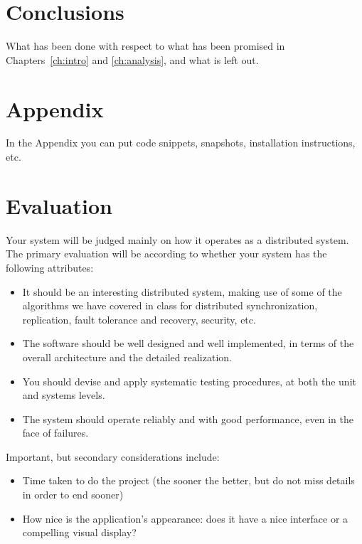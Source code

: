 \documentclass{memoir}
\begin{document}
\chapter{Conclusions}

What has been done with respect to what has been promised in Chapters~\ref{ch:intro} and \ref{ch:analysis}, and what is left out.

\appendix

\chapter{Appendix}

In the Appendix you can put code snippets, snapshots, installation instructions, etc.


\chapter*{Evaluation}
Your system will be judged mainly on how it operates as a distributed system. The primary evaluation will be according to whether your system has the following attributes:
\begin{itemize}
\item  It should be an interesting distributed system, making use of some of the algorithms we have covered in class for distributed synchronization, replication, fault tolerance and recovery, security, etc.
\item The software should be well designed and well implemented, in terms of the overall architecture and the detailed realization.
\item You should devise and apply systematic testing procedures, at both the unit and systems levels.
\item The system should operate reliably and with good performance, even in the face of failures.
\end{itemize}
Important, but secondary considerations include:
\begin{itemize}
\item Time taken to do the project (the sooner the better, but do not miss details in order to end sooner)
\item  How nice is the application's appearance: does it have a nice interface or a compelling visual display?
\end{itemize}
\end{document}

